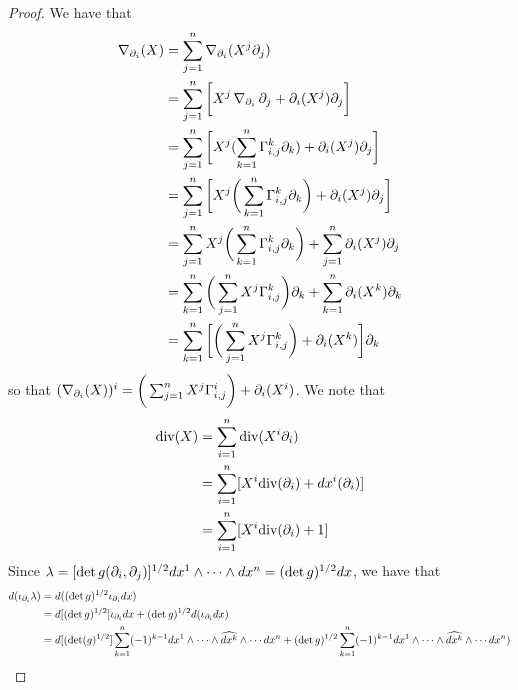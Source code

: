 \documentclass{book}
\begin{document}
\begin{proof}
	We have that 
	\begin{align*}
		\operatorname{\nabla}_{\partial_i}(X) 
		& = \sum_{j=1}^n \operatorname{\nabla}_{\partial_i}(X^j \partial_j) \\
		& = \sum_{j=1}^n \bigg[ X^j \operatorname{\nabla}_{\partial_i} \partial_j + \partial_i(X^j) \partial_j \bigg] \\
		& = \sum_{j=1}^n \bigg[ X^j (\sum_{k=1}^n \Gamma_{i,j}^k \partial_k) + \partial_i(X^j) \partial_j \bigg] \\
		& = \sum_{j=1}^n \bigg[ X^j \bigg(\sum_{k=1}^n \Gamma_{i,j}^k \partial_k \bigg) + \partial_i(X^j) \partial_j \bigg] \\
		& = \sum_{j=1}^n  X^j \bigg(\sum_{k=1}^n \Gamma_{i,j}^k \partial_k \bigg) + \sum_{j=1}^n \partial_i(X^j) \partial_j \\
		& = \sum_{k=1}^n \bigg(\sum_{j=1}^n  X^j\Gamma_{i,j}^k \bigg)\partial_k + \sum_{k=1}^n \partial_i(X^k) \partial_k  \\
		& = \sum_{k=1}^n \bigg[ \bigg(\sum_{j=1}^n  X^j\Gamma_{i,j}^k  \bigg) + \partial_i(X^k) \bigg] \partial_k \\
	\end{align*}
	so that $(\operatorname{\nabla}_{\partial_i}(X) )^i = \bigg(\sum_{j=1}^n  X^j\Gamma_{i,j}^i  \bigg) + \partial_i(X^i)$. We note that 
	\begin{align*}
		\text{div}(X)
		& = \sum_{i=1}^n \text{div}(X^i \partial_i) \\
		& = \sum_{i=1}^n [X^i \text{div}(\partial_i) + dx^i(\partial_i)] \\
		& = \sum_{i=1}^n [X^i \text{div}(\partial_i) + 1] \\
	\end{align*}
	Since $\lambda = [\det g(\partial_i, \partial_j)]^{1/2} dx^1 \wedge \cdots \wedge dx^n = (\det g)^{1/2} dx$, we have that
	\begin{align*}
		d(\iota_{\partial_i} \lambda )
		& = d((\det g)^{1/2} \iota_{\partial_i} dx) \\
		& = d [(\det g)^{1/2}] \iota_{\partial_i} dx + (\det g)^{1/2} d(\iota_{\partial_i} dx ) \\
		& = d[(\det(g)^{1/2}]  \sum_{k=1}^n (-1)^{k-1} dx^1 \wedge \cdots \wedge \widehat{dx^k} \wedge \cdots dx^n + (\det g)^{1/2} \sum_{k=1}^n (-1)^{k-1} dx^1 \wedge \cdots \wedge \widehat{dx^k} \wedge \cdots dx^n) 
	\end{align*}
\end{proof}
\end{document}
